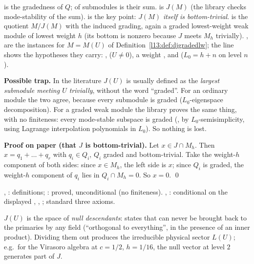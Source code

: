 \begin{dictionary}
 is the gradedness of $Q$;  of submodules is their sum.  is $J(M)$ (the library checks
mode-stability of the sum).  is the key point: \emph{$J(M)$ itself is bottom-trivial}.  is
the quotient $M/J(M)$ with the induced grading, again a graded lowest-weight weak module of lowest weight $h$ (its bottom is
nonzero because $J$ meets $M_h$ trivially). ,  are the instances for $M = M(U)$ of
Definition~\ref{l13:def:djgradedlw}; the  line shows the hypotheses they carry: , 
($U\neq0$), a weight , and  ($L_0 = h+n$ on level $n$).

\textbf{Possible trap.} In the literature $J(U)$ is usually defined as the \emph{largest submodule meeting $U$ trivially}, without
the word ``graded''. For an ordinary module the two agree, because every submodule is graded ($L_0$-eigenspace decomposition). For
a graded weak module the library proves the same thing, with no finiteness: every mode-stable subspace is graded
(, by $L_0$-semisimplicity, using Lagrange interpolation polynomials in $L_0$). So nothing is lost.
\end{dictionary}

\textbf{Proof on paper (that $J$ is bottom-trivial).} Let $x\in J\cap M_h$. Then $x = q_1+\dots+q_r$ with $q_i\in Q_i$, $Q_i$
graded and bottom-trivial. Take the weight-$h$ component of both sides: since $x\in M_h$, the left side is $x$; since $Q_i$ is
graded, the weight-$h$ component of $q_i$ lies in $Q_i\cap M_h = 0$. So $x = 0$. \qed

\begin{status}
, : definitions; : proved, unconditional (no finiteness). ,
: conditional on the displayed , , ; standard three axioms.
\end{status}

\begin{physics}
$J(U)$ is the space of \emph{null descendants}: states that can never be brought back to the primaries by any field
(``orthogonal to everything'', in the presence of an inner product). Dividing them out produces the irreducible physical
sector $L(U)$; e.g.\ for the Virasoro algebra at $c = 1/2$, $h = 1/16$, the null vector at level $2$ generates part of $J$.
\end{physics}

